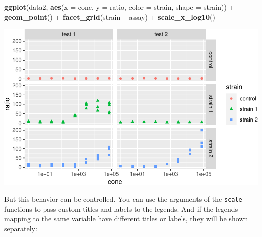 \documentclass[]{book}
\newenvironment{Shaded}{}{}
\newcommand{\DataTypeTok}[1]{\textcolor[rgb]{0.56,0.13,0.00}{#1}}
\newcommand{\KeywordTok}[1]{\textcolor[rgb]{0.00,0.44,0.13}{\textbf{#1}}}
\newcommand{\NormalTok}[1]{#1}
\newcommand{\OperatorTok}[1]{\textcolor[rgb]{0.40,0.40,0.40}{#1}}
\newcommand{\StringTok}[1]{\textcolor[rgb]{0.25,0.44,0.63}{#1}}
\begin{document}
\begin{Shaded}
\begin{Highlighting}[]
\KeywordTok{ggplot}\NormalTok{(data2, }\KeywordTok{aes}\NormalTok{(}\DataTypeTok{x =}\NormalTok{ conc, }\DataTypeTok{y =}\NormalTok{ ratio, }\DataTypeTok{color =}\NormalTok{ strain, }\DataTypeTok{shape =}\NormalTok{ strain)) }\OperatorTok{+}
\StringTok{  }\KeywordTok{geom_point}\NormalTok{() }\OperatorTok{+}
\StringTok{  }\KeywordTok{facet_grid}\NormalTok{(strain }\OperatorTok{~}\StringTok{ }\NormalTok{assay) }\OperatorTok{+}
\StringTok{  }\KeywordTok{scale_x_log10}\NormalTok{()}
\end{Highlighting}
\end{Shaded}

\begin{center}\includegraphics[width=\textwidth]{TRES-Tidy-Tutorial_files/figure-latex/unnamed-chunk-148-1} \end{center}

But this behavior can be controlled. You can use the arguments of the \texttt{scale\_} functions to pass custom titles and labels to the legends. And if the legends mapping to the same variable have different titles or labels, they will be shown separately:
\end{document}
